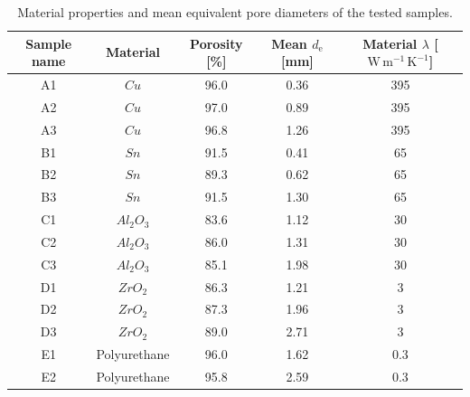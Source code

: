 \documentclass[a4paper]{article}
\begin{document}
\begin{table}[h!]
\centering
\begin{tabular}{|c|c|c|c|c|}
\hline
\textbf{Sample name} & \textbf{Material} & \textbf{Porosity} [\%] & \textbf{Mean $d_{\mathrm{e}}$} [mm] & \textbf{Material $\lambda$} [$\mathrm{W\,m^{-1}\,K^{-1}}$] \\ \hline
A1 & $Cu$ & 96.0 & 0.36 & 395 \\ \hline
A2 & $Cu$ & 97.0 & 0.89 & 395 \\ \hline
A3 & $Cu$ & 96.8 & 1.26 & 395 \\ \hline
B1 & $Sn$ & 91.5 & 0.41 & 65 \\ \hline
B2 & $Sn$ & 89.3 & 0.62 & 65 \\ \hline
B3 & $Sn$ & 91.5 & 1.30 & 65 \\ \hline
C1 & $Al_2O_3$ & 83.6 & 1.12 & 30 \\ \hline
C2 & $Al_2O_3$ & 86.0 & 1.31 & 30 \\ \hline
C3 & $Al_2O_3$ & 85.1 & 1.98 & 30 \\ \hline
D1 & $ZrO_2$ & 86.3 & 1.21 & 3 \\ \hline
D2 & $ZrO_2$ & 87.3 & 1.96 & 3 \\ \hline
D3 & $ZrO_2$ & 89.0 & 2.71 & 3 \\ \hline
E1 & Polyurethane & 96.0 & 1.62 & 0.3 \\ \hline
E2 & Polyurethane & 95.8 & 2.59 & 0.3 \\ \hline
\end{tabular}
\caption{Material properties and mean equivalent pore diameters of the tested samples.}
\label{tab:vzorky23}
\end{table}
\end{document}

